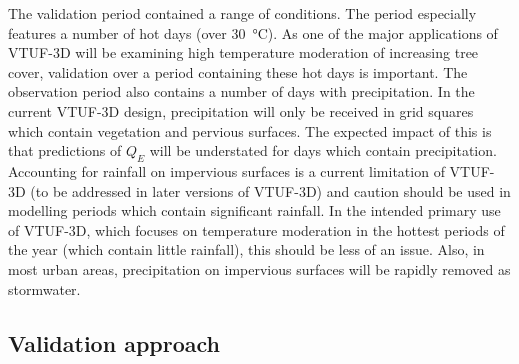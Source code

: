 \documentclass[final,3p,times,authoryear]{elsarticle}
\begin{document}
The validation period contained a range of conditions. The period especially features a number of hot days (over \SI{30}{\degreeCelsius}). As one of the major applications of VTUF-3D will be examining high temperature moderation of increasing tree cover, validation over a period containing these hot days is important. The observation period also contains a number of days with precipitation. In the current VTUF-3D design, precipitation will only be received in grid squares which contain vegetation and pervious surfaces. The expected impact of this is that predictions of $Q_{E}$ will be understated for days which contain precipitation. Accounting for rainfall on impervious surfaces is a current limitation of VTUF-3D (to be addressed in later versions of VTUF-3D) and caution should be used in modelling periods which contain significant rainfall. In the intended primary use of VTUF-3D, which focuses on temperature moderation in the hottest periods of the year (which contain little rainfall), this should be less of an issue. Also, in most urban areas, precipitation on impervious surfaces will be rapidly removed as stormwater.

\subsection{Validation approach}\label{sec:prvalresults}
\end{document}
